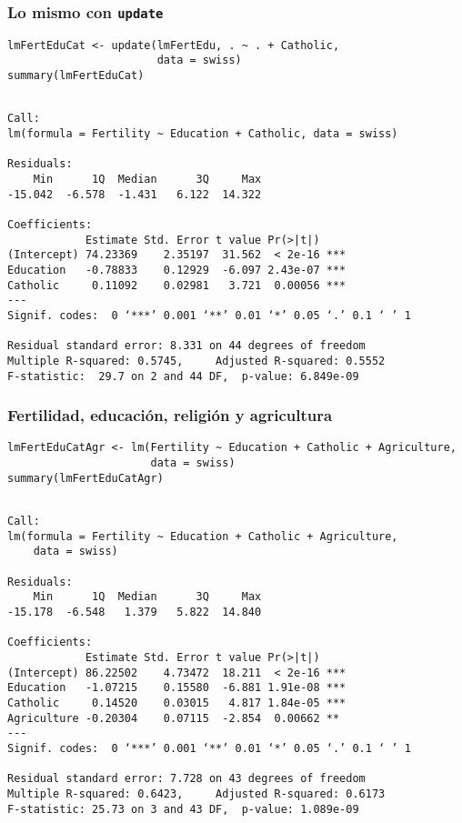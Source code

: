 \documentclass{beamer}
\begin{document}
\begin{frame}[fragile]
\frametitle{Lo mismo con \texttt{update}}
\label{sec-3-4}


\lstset{language=R}
\begin{lstlisting}
lmFertEduCat <- update(lmFertEdu, . ~ . + Catholic,
                       data = swiss)
summary(lmFertEduCat)
\end{lstlisting}


\begin{verbatim}

Call:
lm(formula = Fertility ~ Education + Catholic, data = swiss)

Residuals:
    Min      1Q  Median      3Q     Max 
-15.042  -6.578  -1.431   6.122  14.322 

Coefficients:
            Estimate Std. Error t value Pr(>|t|)    
(Intercept) 74.23369    2.35197  31.562  < 2e-16 ***
Education   -0.78833    0.12929  -6.097 2.43e-07 ***
Catholic     0.11092    0.02981   3.721  0.00056 ***
---
Signif. codes:  0 ‘***’ 0.001 ‘**’ 0.01 ‘*’ 0.05 ‘.’ 0.1 ‘ ’ 1 

Residual standard error: 8.331 on 44 degrees of freedom
Multiple R-squared: 0.5745,     Adjusted R-squared: 0.5552 
F-statistic:  29.7 on 2 and 44 DF,  p-value: 6.849e-09
\end{verbatim}
\end{frame}
\begin{frame}[fragile]
\frametitle{Fertilidad, educación, religión y agricultura}
\label{sec-3-5}


\lstset{language=R}
\begin{lstlisting}
lmFertEduCatAgr <- lm(Fertility ~ Education + Catholic + Agriculture,
                      data = swiss)
summary(lmFertEduCatAgr)
\end{lstlisting}


\begin{verbatim}

Call:
lm(formula = Fertility ~ Education + Catholic + Agriculture, 
    data = swiss)

Residuals:
    Min      1Q  Median      3Q     Max 
-15.178  -6.548   1.379   5.822  14.840 

Coefficients:
            Estimate Std. Error t value Pr(>|t|)    
(Intercept) 86.22502    4.73472  18.211  < 2e-16 ***
Education   -1.07215    0.15580  -6.881 1.91e-08 ***
Catholic     0.14520    0.03015   4.817 1.84e-05 ***
Agriculture -0.20304    0.07115  -2.854  0.00662 ** 
---
Signif. codes:  0 ‘***’ 0.001 ‘**’ 0.01 ‘*’ 0.05 ‘.’ 0.1 ‘ ’ 1 

Residual standard error: 7.728 on 43 degrees of freedom
Multiple R-squared: 0.6423,     Adjusted R-squared: 0.6173 
F-statistic: 25.73 on 3 and 43 DF,  p-value: 1.089e-09
\end{verbatim}
\end{frame}
\end{document}
